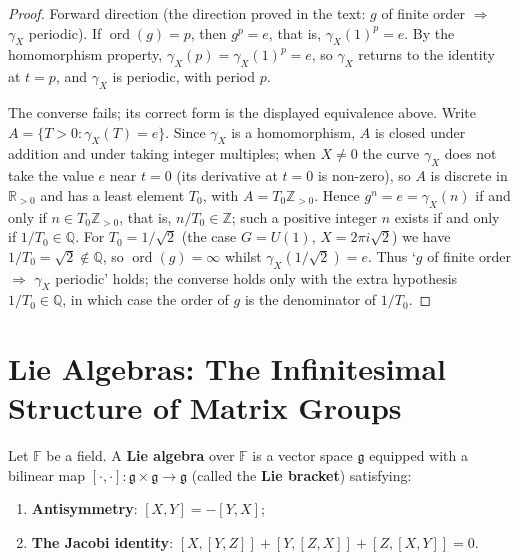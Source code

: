 \begin{proof}
Forward direction (the direction proved in the text: $g$ of finite order $\Rightarrow$ $\gamma_X$ periodic). If $\operatorname{ord}(g) = p$, then $g^p = e$, that is, $\gamma_X(1)^p = e$. By the homomorphism property, $\gamma_X(p) = \gamma_X(1)^p = e$, so $\gamma_X$ returns to the identity at $t = p$, and $\gamma_X$ is periodic, with period $p$.

The converse fails; its correct form is the displayed equivalence above. Write $A=\{T>0:\gamma_X(T)=e\}$. Since $\gamma_X$ is a homomorphism, $A$ is closed under addition and under taking integer multiples; when $X\ne0$ the curve $\gamma_X$ does not take the value $e$ near $t=0$ (its derivative at $t=0$ is non-zero), so $A$ is discrete in $\mathbb{R}_{>0}$ and has a least element $T_0$, with $A=T_0\mathbb{Z}_{>0}$. Hence $g^n=e=\gamma_X(n)$ if and only if $n\in T_0\mathbb{Z}_{>0}$, that is, $n/T_0\in\mathbb{Z}$; such a positive integer $n$ exists if and only if $1/T_0\in\mathbb{Q}$. For $T_0=1/\sqrt2$ (the case $G=U(1)$, $X=2\pi i\sqrt2$) we have $1/T_0=\sqrt2\notin\mathbb{Q}$, so $\operatorname{ord}(g)=\infty$ whilst $\gamma_X(1/\sqrt2)=e$. Thus `$g$ of finite order $\Rightarrow$ $\gamma_X$ periodic' holds; the converse holds only with the extra hypothesis $1/T_0\in\mathbb{Q}$, in which case the order of $g$ is the denominator of $1/T_0$.
\end{proof}

\section{\texorpdfstring{Lie Algebras: The Infinitesimal Structure of Matrix Groups}{Lie Algebras: The Infinitesimal Structure of Matrix Groups}}

\begin{definition}\label{def:lie_algebra}
Let $\mathbb{F}$ be a field. A \textbf{Lie algebra} over $\mathbb{F}$ is a vector space $\mathfrak{g}$ equipped with a bilinear map $[\cdot, \cdot]: \mathfrak{g} \times \mathfrak{g} \to \mathfrak{g}$ (called the \textbf{Lie bracket}) satisfying:
\begin{enumerate}[label=(\roman*)]
    \item \textbf{Antisymmetry}: $[X, Y] = -[Y, X]$;
    \item \textbf{The Jacobi identity}: $[X, [Y, Z]] + [Y, [Z, X]] + [Z, [X, Y]] = 0$.
\end{enumerate}
\end{definition}

